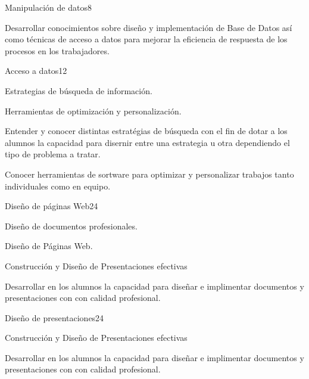 \begin{syllabus}
\begin{unit}{Manipulación de datos}{}{8}
   \begin{learningoutcomes}
      \item  Desarrollar conocimientos sobre diseño y implementación de Base de Datos así como técnicas de acceso a datos para mejorar la eficiencia de respuesta de los procesos en los trabajadores.
   \end{learningoutcomes}
\end{unit}

\begin{unit}{Acceso a datos}{}{12}
   \begin{topics}
      \item Estrategias de búsqueda de información.
      \item Herramientas de optimización y personalización.
   \end{topics}

   \begin{learningoutcomes}
      \item Entender y conocer distintas estratégias de búsqueda con el fin de dotar a los alumnos la capacidad para disernir entre una estrategia  u otra dependiendo el tipo de problema a tratar.
      \item  Conocer herramientas de sortware para optimizar y personalizar trabajos tanto individuales como en equipo.
   \end{learningoutcomes}
\end{unit}

\begin{unit}{Diseño de páginas Web}{}{24}
   \begin{topics}
      \item Diseño de documentos profesionales.
      \item Diseño de Páginas Web.
      \item Construcción  y Diseño de Presentaciones  efectivas 
    \end{topics}
  \begin{learningoutcomes}
      \item Desarrollar en los alumnos la capacidad para diseñar  e implimentar documentos y presentaciones con 
       con calidad profesional.
  \end{learningoutcomes}
\end{unit}

\begin{unit}{Diseño de presentaciones}{}{24}
   \begin{topics}
      \item Construcción  y Diseño de Presentaciones  efectivas 
    \end{topics}
  \begin{learningoutcomes}
      \item Desarrollar en los alumnos la capacidad para diseñar  e implimentar documentos y presentaciones con 
       con calidad profesional.
  \end{learningoutcomes}
\end{unit}


\end{syllabus}
